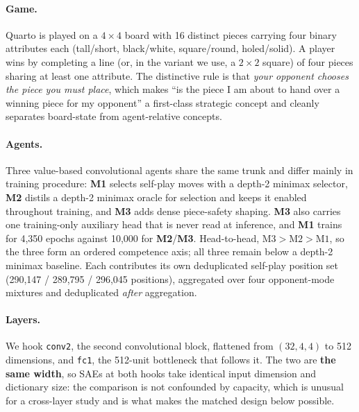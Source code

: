 \documentclass{article}
\begin{document}
\paragraph{Game.} Quarto is played on a $4\times4$ board with 16 distinct
pieces carrying four binary attributes each (tall/short, black/white,
square/round, holed/solid). A player wins by completing a line (or, in the
variant we use, a $2\times2$ square) of four pieces sharing at least one
attribute. The distinctive rule is that \emph{your opponent chooses the piece
  you must place}, which makes ``is the piece I am about to hand over a winning
piece for my opponent'' a first-class strategic concept and cleanly separates
board-state from agent-relative concepts.

\paragraph{Agents.} Three value-based convolutional agents share the same trunk
and differ mainly in training procedure: \textbf{M1} selects self-play moves with
a depth-2 minimax selector, \textbf{M2} distils a depth-2 minimax oracle for
selection and keeps it enabled throughout training, and \textbf{M3} adds dense
piece-safety shaping. \textbf{M3} also carries one training-only auxiliary head
that is never read at inference, and \textbf{M1} trains for 4{,}350 epochs
against 10{,}000 for \textbf{M2}/\textbf{M3}. Head-to-head, $\text{M3} >
  \text{M2} > \text{M1}$, so the three form an ordered competence axis; all three
remain below a depth-2 minimax baseline. Each contributes its own deduplicated
self-play position set (290{,}147 / 289{,}795 / 296{,}045 positions), aggregated
over four opponent-mode mixtures and deduplicated \emph{after} aggregation.

\paragraph{Layers.} We hook \texttt{conv2}, the second convolutional block,
flattened from $(32,4,4)$ to 512 dimensions, and \texttt{fc1}, the 512-unit
bottleneck that follows it. The two are \textbf{the same width}, so SAEs at both
hooks take identical input dimension and dictionary size: the comparison is not
confounded by capacity, which is unusual for a cross-layer study and is what
makes the matched design below possible.
\end{document}
